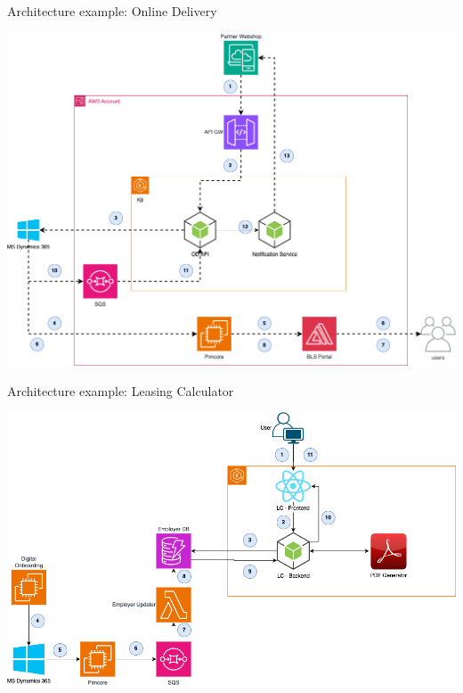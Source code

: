 \begin{frame}{Architecture example: Online Delivery}
  \begin{center}
    \includegraphics[scale=.3]{./assets/od.png}
  \end{center}
\end{frame}

\begin{frame}{Architecture example: Leasing Calculator}
  \begin{center}
    \includegraphics[scale=.3]{./assets/lc.png}
  \end{center}
\end{frame}

